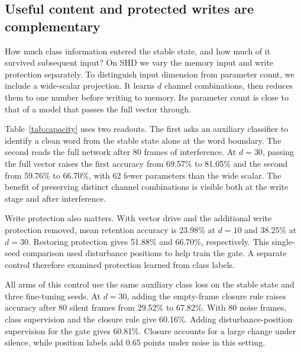 \documentclass[10pt,twocolumn]{article}
\begin{document}
\subsection{Useful content and protected writes are complementary}
How much class information entered the stable state, and how much of it survived subsequent input? On SHD we vary the memory input and write protection separately. To distinguish input dimension from parameter count, we include a wide-scalar projection. It learns $d$ channel combinations, then reduces them to one number before writing to memory. Its parameter count is close to that of a model that passes the full vector through.

Table~\ref{tab:capacity} uses two readouts. The first asks an auxiliary classifier to identify a clean word from the stable state alone at the word boundary. The second reads the full network after 80 frames of interference. At $d=30$, passing the full vector raises the first accuracy from 69.57\% to 81.05\% and the second from 59.76\% to 66.70\%, with 62 fewer parameters than the wide scalar. The benefit of preserving distinct channel combinations is visible both at the write stage and after interference.

Write protection also matters. With vector drive and the additional write protection removed, mean retention accuracy is 23.98\% at $d=10$ and 38.25\% at $d=30$. Restoring protection gives 51.88\% and 66.70\%, respectively. This single-seed comparison used disturbance positions to help train the gate. A separate control therefore examined protection learned from class labels.

All arms of this control use the same auxiliary class loss on the stable state and three fine-tuning seeds. At $d=30$, adding the empty-frame closure rule raises accuracy after 80 silent frames from 29.52\% to 67.82\%. With 80 noise frames, class supervision and the closure rule give 60.16\%. Adding disturbance-position supervision for the gate gives 60.81\%. Closure accounts for a large change under silence, while position labels add 0.65 points under noise in this setting.
\end{document}
